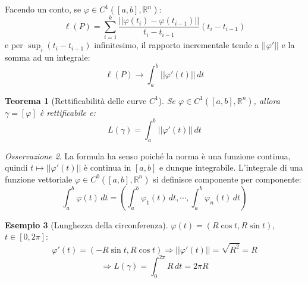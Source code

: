 \documentclass[11pt, a4paper, openright]{book}
\theoremstyle{plain}
\newtheorem{teorema}{Teorema}[section]
\theoremstyle{definition}
\newtheorem{esempio}[teorema]{Esempio}
\theoremstyle{remark}
\newtheorem{osservazione}[teorema]{Osservazione}
\begin{document}
Facendo un conto, se $\varphi \in C^1([a, b], \mathbb{R}^n)$:
\begin{equation}
    \ell(P) = \sum_{i = 1}^{k} \frac{||\varphi(t_i) - \varphi(t_{i - 1})||}{t_i - t_{i - 1}}(t_i - t_{i - 1})
\end{equation}
e per $\sup_i(t_i - t_{i - 1})$ infinitesimo, il rapporto incrementale tende a $||\varphi'||$ e la somma ad un integrale:
\begin{equation}
    \ell(P) \longrightarrow \int_{a}^{b} ||\varphi'(t)|| \, dt
\end{equation}

\begin{teorema}[Rettificabilità delle curve $C^1$]
    Se $\varphi \in C^1([a, b], \mathbb{R}^n)$, allora $\gamma = [\varphi]$ è rettificabile e:
    \begin{equation}
        L(\gamma) = \int_{a}^{b} ||\varphi'(t)|| \, dt
    \end{equation}
\end{teorema}

\begin{osservazione}
    La formula ha senso poiché la norma è una funzione continua, quindi $t \longmapsto ||\varphi'(t)||$ è continua in $[a, b]$ e dunque integrabile. L'integrale di una funzione vettoriale $\varphi \in C^0([a, b], \mathbb{R}^n)$ si definisce componente per componente:
    \begin{equation}
        \int_{a}^{b} \varphi(t) \, dt = \left(\int_{a}^{b} \varphi_1(t) \, dt, \cdots, \int_{a}^{b} \varphi_n(t) \, dt\right)
    \end{equation}
\end{osservazione}

\begin{esempio}[Lunghezza della circonferenza]
    $\varphi(t) = (R\cos t, R\sin t)$, $t \in [0, 2\pi]$:
    \begin{equation}
        \varphi'(t) = (-R\sin t, R\cos t) \Longrightarrow ||\varphi'(t)|| = \sqrt{R^2} = R
    \end{equation}
    \begin{equation}
        \Longrightarrow L(\gamma) = \int_{0}^{2\pi} R \, dt = 2\pi R
    \end{equation}
\end{esempio}
\end{document}
